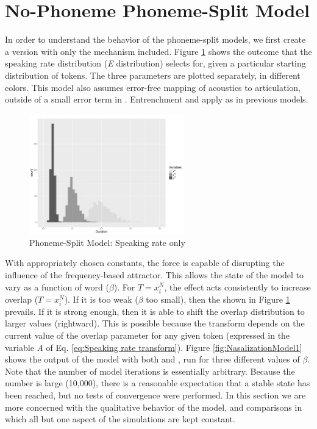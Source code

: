 \section{\label{sec:No-Phoneme-Phoneme-Split-Model}No-Phoneme Phoneme-Split Model}\largerpage

In order to understand the behavior of the phoneme-split models, we
first create a version with only the  mechanism included.
Figure \ref{fig:SpeakingRateOnly} shows the outcome that the speaking
rate distribution (\emph{E} distribution) selects for, given a particular
starting distribution of tokens. The three  parameters
are plotted separately, in different colors. This model also assumes
error-free mapping of acoustics to articulation, outside of a small
error term in . Entrenchment and  apply as in
previous models.

\begin{figure}[h]
\includegraphics[width=0.6\textwidth]{figures/SpeakingRateI10000.pdf}\caption{\label{fig:SpeakingRateOnly}Phoneme-Split Model: Speaking rate only}
\end{figure}

With appropriately chosen constants, the  force is capable
of disrupting the influence of the frequency-based attractor. This
allows the  state of the model to vary as a function of
word  ($\beta$). For $T=x_{i}^{N}$, the  effect
acts consistently to increase  overlap ($T=x_{i}^{N}$). If
it is too weak ($\beta$ too small), then the  
shown in Figure \ref{fig:SpeakingRateOnly} prevails. If it is strong
enough, then it is able to shift the overlap distribution to larger
values (rightward). This is possible because the  transform
depends on the current value of the overlap parameter for any given
token (expressed in the variable \emph{A} of Eq. \ref{eq:Speaking rate transform}).
Figure \ref{fig:NasalizationModel1} shows the output of the model
with both  and  , run for three different
values of $\beta$. Note that the number of model iterations is essentially
arbitrary. Because the number is large (10,000), there is a reasonable
expectation that a stable state has been reached, but no tests of
convergence were performed. In this section we are more concerned
with the qualitative behavior of the model, and comparisons in which
all but one aspect of the simulations are kept constant.

